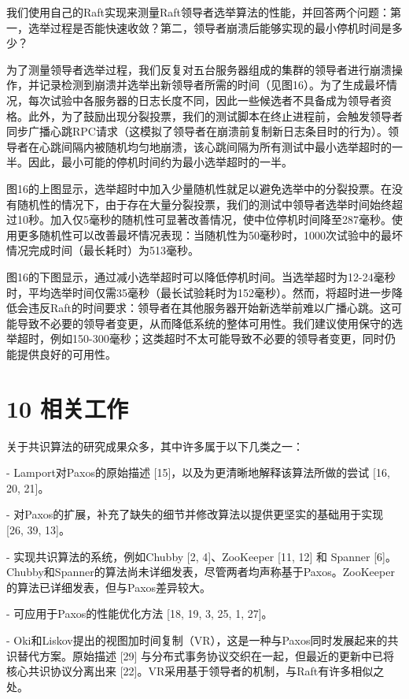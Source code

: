 \documentclass[12pt,a4paper]{report} %
\begin{document}
我们使用自己的Raft实现来测量Raft领导者选举算法的性能，并回答两个问题：第一，选举过程是否能快速收敛？第二，领导者崩溃后能够实现的最小停机时间是多少？

为了测量领导者选举过程，我们反复对五台服务器组成的集群的领导者进行崩溃操作，并记录检测到崩溃并选举出新领导者所需的时间（见图16）。为了生成最坏情况，每次试验中各服务器的日志长度不同，因此一些候选者不具备成为领导者资格。此外，为了鼓励出现分裂投票，我们的测试脚本在终止进程前，会触发领导者同步广播心跳RPC请求（这模拟了领导者在崩溃前复制新日志条目时的行为）。领导者在心跳间隔内被随机均匀地崩溃，该心跳间隔为所有测试中最小选举超时的一半。因此，最小可能的停机时间约为最小选举超时的一半。

图16的上图显示，选举超时中加入少量随机性就足以避免选举中的分裂投票。在没有随机性的情况下，由于存在大量分裂投票，我们的测试中领导者选举时间始终超过10秒。加入仅5毫秒的随机性可显著改善情况，使中位停机时间降至287毫秒。使用更多随机性可以改善最坏情况表现：当随机性为50毫秒时，1000次试验中的最坏情况完成时间（最长耗时）为513毫秒。

图16的下图显示，通过减小选举超时可以降低停机时间。当选举超时为12-24毫秒时，平均选举时间仅需35毫秒（最长试验耗时为152毫秒）。然而，将超时进一步降低会违反Raft的时间要求：领导者在其他服务器开始新选举前难以广播心跳。这可能导致不必要的领导者变更，从而降低系统的整体可用性。我们建议使用保守的选举超时，例如150-300毫秒；这类超时不太可能导致不必要的领导者变更，同时仍能提供良好的可用性。

\section*{10 相关工作}

关于共识算法的研究成果众多，其中许多属于以下几类之一：

- Lamport对Paxos的原始描述 [15]，以及为更清晰地解释该算法所做的尝试 [16, 20, 21]。

- 对Paxos的扩展，补充了缺失的细节并修改算法以提供更坚实的基础用于实现 [26, 39, 13]。

- 实现共识算法的系统，例如Chubby [2, 4]、ZooKeeper [11, 12] 和 Spanner [6]。Chubby和Spanner的算法尚未详细发表，尽管两者均声称基于Paxos。ZooKeeper的算法已详细发表，但与Paxos差异较大。

- 可应用于Paxos的性能优化方法 [18, 19, 3, 25, 1, 27]。

- Oki和Liskov提出的视图加时间复制（VR），这是一种与Paxos同时发展起来的共识替代方案。原始描述 [29] 与分布式事务协议交织在一起，但最近的更新中已将核心共识协议分离出来 [22]。VR采用基于领导者的机制，与Raft有许多相似之处。
\end{document}
